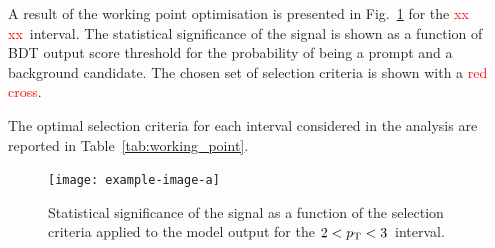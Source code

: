 A result of the working point optimisation is presented in Fig.~\ref{fig:ml_significance} for the \textcolor{red}{xx xx}~\gevc interval. The statistical significance of the signal is shown as a function of BDT output score threshold for the probability of being a prompt \ds and a background candidate. The chosen set of selection criteria is shown with a \textcolor{red}{red cross}.

The optimal selection criteria for each \pt interval considered in the analysis are reported in Table~\ref{tab:working_point}.


\begin{figure}
    \centering
    \texttt{[image: example-image-a]}
    \caption{Statistical significance of the signal as a function of the selection criteria applied to the model output for the $2<p_\mathrm{T}<3$~\gevc interval.}
    \label{fig:ml_significance}
\end{figure}

\begin{table}[b!]
    \centering
    \caption{Selection criteria applied to enhance the significance of the $\ds$ meson contribution in the $\pt$ bins of the analysis.}
    \label{tab:working_point}
    \vspace*{0.3cm}
\end{table}


